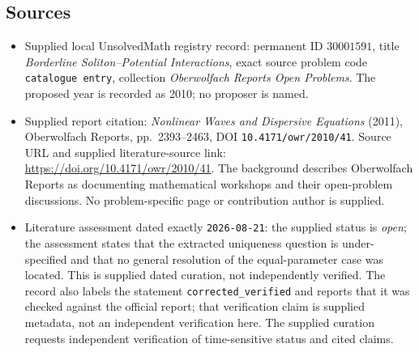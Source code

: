 \documentclass[11pt]{article}
\begin{document}
\subsection{Sources}
\begin{itemize}
\item Supplied local UnsolvedMath registry record: permanent ID \(30001591\), title \emph{Borderline Soliton--Potential Interactions}, exact source problem code \texttt{catalogue entry}, collection \emph{Oberwolfach Reports Open Problems}. The proposed year is recorded as 2010; no proposer is named.
\item Supplied report citation: \emph{Nonlinear Waves and Dispersive Equations} (2011), Oberwolfach Reports, pp.\ 2393--2463, DOI \texttt{10.4171/owr/2010/41}. Source URL and supplied literature-source link: \url{https://doi.org/10.4171/owr/2010/41}. The background describes Oberwolfach Reports as documenting mathematical workshops and their open-problem discussions. No problem-specific page or contribution author is supplied.
\item Literature assessment dated exactly \texttt{2026-08-21}: the supplied status is \emph{open}; the assessment states that the extracted uniqueness question is under-specified and that no general resolution of the equal-parameter case was located. This is supplied dated curation, not independently verified. The record also labels the statement \texttt{corrected\_verified} and reports that it was checked against the official report; that verification claim is supplied metadata, not an independent verification here. The supplied curation requests independent verification of time-sensitive status and cited claims.
\end{itemize}
\end{document}

